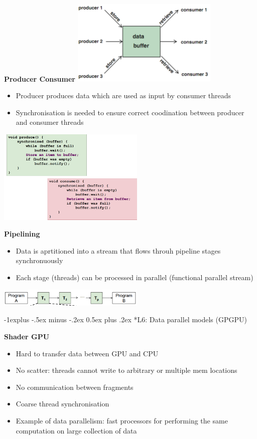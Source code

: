 \documentclass[10pt, landscape]{article}
\makeatletter
\renewcommand{\subsection}{\@startsection{subsection}{2}{0mm}%
                                {-1explus -.5ex minus -.2ex}%
                                {0.5ex plus .2ex}%
                                {\normalfont\normalsize\bfseries}}
\makeatother
\begin{document}
\begin{multicols}{4}
\textbf{Producer Consumer}
\includegraphics*[width=7cm]{producer_consumer}
\begin{itemize}
    \item Producer produces data which are used as input by consumer threads 
    \item Synchronisation is needed to ensure correct coodination between producer and consumer threads 
\end{itemize}
\includegraphics*[width=7cm]{producer_consumer_code}


\textbf{Pipelining}
\begin{itemize}
    \item Data is aprtitioned into a stream that flows throuh pipeline stages synchronuously 
    \item Each stage (threads) can be processed in parallel (functional parallel stream)
\end{itemize} 
\includegraphics*[width=7cm]{pipeline_pattern}

\subsection*{L6: Data parallel models (GPGPU)}

\textbf{Shader GPU}
\begin{itemize}
    \item Hard to transfer data between GPU and CPU
    \item No scatter: threads cannot write to arbitrary or multiple mem locations
    \item No communication between fragments 
    \item Coarse thread synchronisation
    \item Example of data parallelism: fast processors for performing the same computation on large collection of data
\end{itemize}


\end{multicols}
\end{document}
